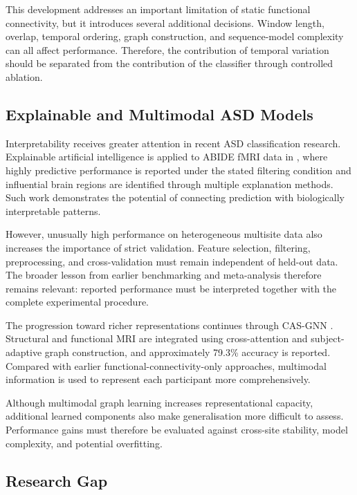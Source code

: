 \documentclass[a4paper,fleqn]{cas-sc}
\begin{document}
This development addresses an important limitation of static functional connectivity, but it introduces several additional decisions. Window length, overlap, temporal ordering, graph construction, and sequence-model complexity can all affect performance. Therefore, the contribution of temporal variation should be separated from the contribution of the classifier through controlled ablation.

\subsection{Explainable and Multimodal ASD Models}

Interpretability receives greater attention in recent ASD classification research. Explainable artificial intelligence is applied to ABIDE fMRI data in \cite{Vidyaetal2025}, where highly predictive performance is reported under the stated filtering condition and influential brain regions are identified through multiple explanation methods. Such work demonstrates the potential of connecting prediction with biologically interpretable patterns.

However, unusually high performance on heterogeneous multisite data also increases the importance of strict validation. Feature selection, filtering, preprocessing, and cross-validation must remain independent of held-out data. The broader lesson from earlier benchmarking \cite{Dadietal2019} and meta-analysis \cite{Santanaetal2022} therefore remains relevant: reported performance must be interpreted together with the complete experimental procedure.

The progression toward richer representations continues through CAS-GNN \cite{Tangetal2026CASGNN}. Structural and functional MRI are integrated using cross-attention and subject-adaptive graph construction, and approximately 79.3\% accuracy is reported. Compared with earlier functional-connectivity-only approaches, multimodal information is used to represent each participant more comprehensively.

Although multimodal graph learning increases representational capacity, additional learned components also make generalisation more difficult to assess. Performance gains must therefore be evaluated against cross-site stability, model complexity, and potential overfitting.

\subsection{Research Gap}
\end{document}
